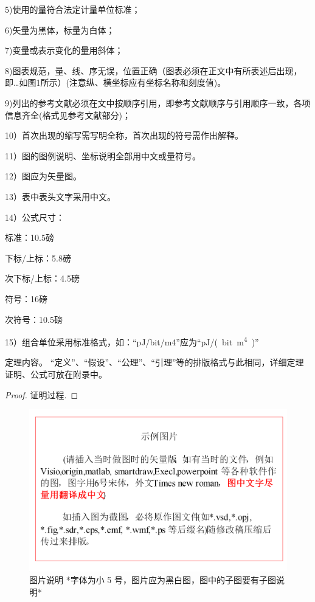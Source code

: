 \documentclass{cjc}
\begin{document}
5)使用的量符合法定计量单位标准；

6)矢量为黑体，标量为白体；

7)变量或表示变化的量用斜体；

8)图表规范，量、线、序无误，位置正确（图表必须在正文中有所表述后出现，即…如图1所示）(注意纵、横坐标应有坐标名称和刻度值)。

9)列出的参考文献必须在文中按顺序引用，即参考文献顺序与引用顺序一致，各项信息齐全(格式见参考文献部分)；

10）首次出现的缩写需写明全称，首次出现的符号需作出解释。

11）图的图例说明、坐标说明全部用中文或量符号。

12）图应为矢量图。

13）表中表头文字采用中文。

14）公式尺寸：

标准：10.5磅

下标/上标：5.8磅

次下标/上标：4.5磅

符号：16磅

次符号：10.5磅

15）组合单位采用标准格式，如：“pJ/bit/m4”应为“\si{pJ/(bit.m^4)}”


\begin{theorem}
  定理内容。
  “定义”、“假设”、“公理”、“引理”等的排版格式与此相同，详细定理证明、公式可放在附录中。
\end{theorem}

\begin{proof}
  证明过程.
\end{proof}

\begin{figure}[htb]
  \centering
  \includegraphics[width=\linewidth]{example-fig.pdf}
  \caption{图片说明 *字体为小 5 号，图片应为黑白图，图中的子图要有子图说明*}
\end{figure}
\end{document}

